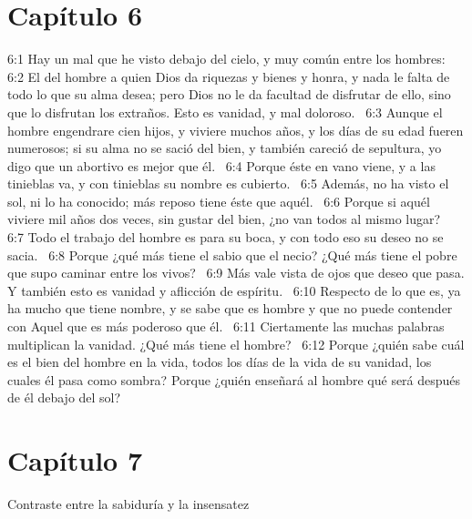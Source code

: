 \section*{Capítulo 6}

6:1 Hay un mal que he visto debajo del cielo, y muy común entre los hombres:  
6:2 El del hombre a quien Dios da riquezas y bienes y honra, y nada le falta de todo lo que su alma desea; pero Dios no le da facultad de disfrutar de ello, sino que lo disfrutan los extraños. Esto es vanidad, y mal doloroso.  
6:3 Aunque el hombre engendrare cien hijos, y viviere muchos años, y los días de su edad fueren numerosos; si su alma no se sació del bien, y también careció de sepultura, yo digo que un abortivo es mejor que él.  
6:4 Porque éste en vano viene, y a las tinieblas va, y con tinieblas su nombre es cubierto.  
6:5 Además, no ha visto el sol, ni lo ha conocido; más reposo tiene éste que aquél.  
6:6 Porque si aquél viviere mil años dos veces, sin gustar del bien, ¿no van todos al mismo lugar?  
6:7 Todo el trabajo del hombre es para su boca, y con todo eso su deseo no se sacia.  
6:8 Porque ¿qué más tiene el sabio que el necio? ¿Qué más tiene el pobre que supo caminar entre los vivos?  
6:9 Más vale vista de ojos que deseo que pasa. Y también esto es vanidad y aflicción de espíritu.  
6:10 Respecto de lo que es, ya ha mucho que tiene nombre, y se sabe que es hombre y que no puede contender con Aquel que es más poderoso que él.  
6:11 Ciertamente las muchas palabras multiplican la vanidad. ¿Qué más tiene el hombre?  
6:12 Porque ¿quién sabe cuál es el bien del hombre en la vida, todos los días de la vida de su vanidad, los cuales él pasa como sombra? Porque ¿quién enseñará al hombre qué será después de él debajo del sol?  
\section*{Capítulo 7}
Contraste entre la sabiduría y la insensatez  

